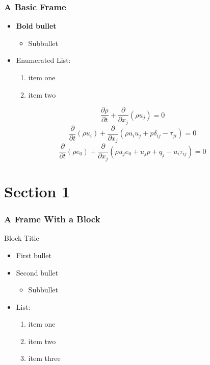 \documentclass[aspectratio=1610]{beamer}
\begin{document}
\begin{frame}
  \frametitle{A Basic Frame}

  \begin{itemize}
  \item \textbf{Bold bullet}
    \begin{itemize}
    \item Subbullet
    \end{itemize}
  \item Enumerated List:
    \begin{enumerate}
    \item item one
    \item item two
    \end{enumerate}
  \end{itemize}
  \begin{equation}
    \frac{\partial \rho}{\partial t} +
    \frac{\partial}{\partial x_{j}} (\rho u_{j}) = 0
  \end{equation}
  \begin{equation}
    \frac{\partial}{\partial t} (\rho u_{i}) +
    \frac{\partial}{\partial x_{j}} (\rho u_{i} u_{j} + p \delta_{ij} - \tau_{ji} )
    = 0
  \end{equation}
  \begin{equation}
    \frac{\partial}{\partial t} ( \rho e_{0} ) +
    \frac{\partial}{\partial x_{j}}
    ( \rho u_{j} e_{0} + u_{j} p + q_{j} - u_{i} \tau_{ij} ) = 0
  \end{equation}
\end{frame}

\section{Section 1}
\begin{frame}
  \frametitle{A Frame With a Block}
  \begin{block}{Block Title}
  \begin{itemize}
  \item First bullet
  \item Second bullet
    \begin{itemize}
    \item Subbullet
    \end{itemize}
  \item List:
    \begin{enumerate}
    \item item one
    \item item two
    \item item three
    \end{enumerate}
  \end{itemize}
  \end{block}
\end{frame}
\end{document}
